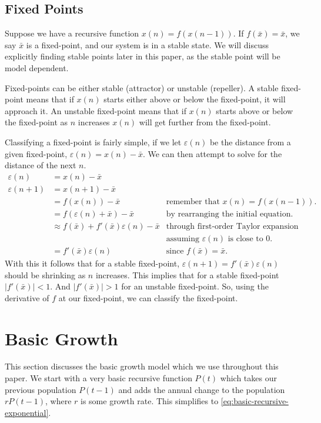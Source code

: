 \documentclass{article}
\begin{document}
\subsection{Fixed Points} \label{sect:fixed-points}
Suppose we have a recursive function $x(n)=f(x(n-1))$. If $f(\bar{x}) = \bar{x}$, we say $\bar{x}$ is a fixed-point, and our system is in a stable state. We will discuss explicitly finding stable points later in this paper, as the stable point will be model dependent.

Fixed-points can be either stable (attractor) or unstable (repeller). A stable fixed-point means that if $x(n)$ starts either above or below the fixed-point, it will approach it. An unstable fixed-point means that if $x(n)$ starts above or below the fixed-point as $n$ increases $x(n)$ will get further from the fixed-point.

Classifying a fixed-point is fairly simple, if we let $\varepsilon(n)$ be the distance from a given fixed-point, $\varepsilon(n) = x(n) - \bar{x}$. We can then attempt to solve for the distance of the next $n$.
\begin{align*}
    \varepsilon(n) &= x(n) - \bar{x} \\
    \varepsilon(n+1) &= x(n+1) - \bar{x} \\
                  &= f(x(n)) - \bar{x} & \text{remember that } x(n)=f(x(n-1)). \\
                  &= f(\varepsilon(n) + \bar{x}) - \bar{x} & \text{by rearranging the initial equation}. \\
                  &\approx f(\bar{x}) + f'(\bar{x})\varepsilon(n) - \bar{x} & \text{through first-order Taylor expansion}\\
                  & &\text{assuming } \varepsilon(n) \text{ is close to 0}. \\
                  &= f'(\bar{x})\varepsilon(n) & \text{since } f(\bar{x})=\bar{x}.
\end{align*}
With this it follows that for a stable fixed-point, $\varepsilon(n+1)=f'(\bar{x})\varepsilon(n)$ should be shrinking as $n$ increases. This implies that for a stable fixed-point $|f'(\bar{x})| < 1$. And $|f'(\bar{x})| > 1$ for an unstable fixed-point. So, using the derivative of $f$ at our fixed-point, we can classify the fixed-point.


\section{Basic Growth}
This section discusses the basic growth model which we use throughout this paper. We start with a very basic recursive function $P(t)$ which takes our previous population $P(t-1)$ and adds the annual change to the population $rP(t-1)$, where $r$ is some growth rate. This simplifies to \cref{eq:basic-recursive-exponential}.
\end{document}
